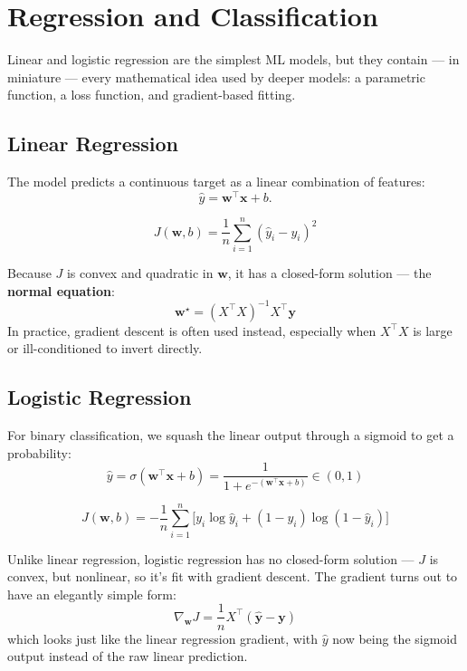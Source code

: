 \chapter{Regression and Classification}

Linear and logistic regression are the simplest ML models, but they
contain — in miniature — every mathematical idea used by deeper models:
a parametric function, a loss function, and gradient-based fitting.

\section{Linear Regression}

The model predicts a continuous target as a linear combination of features:
\[
  \hat y = \mathbf{w}^\top \mathbf{x} + b.
\]

\begin{definition}
\[
  J(\mathbf{w}, b) = \frac{1}{n}\sum_{i=1}^n \left(\hat y_i - y_i\right)^2
\]
\end{definition}

Because $J$ is convex and quadratic in $\mathbf{w}$, it has a closed-form
solution — the \textbf{normal equation}:
\[
  \mathbf{w}^\star = (X^\top X)^{-1} X^\top \mathbf{y}
\]
In practice, gradient descent is often used instead, especially when $X^\top X$
is large or ill-conditioned to invert directly.


\section{Logistic Regression}

For binary classification, we squash the linear output through a sigmoid
to get a probability:
\[
  \hat y = \sigma(\mathbf{w}^\top\mathbf{x} + b) = \frac{1}{1+e^{-(\mathbf{w}^\top\mathbf{x}+b)}} \in (0,1)
\]

\begin{definition}
\[
  J(\mathbf{w}, b) = -\frac{1}{n}\sum_{i=1}^n \Big[y_i \log \hat y_i + (1-y_i)\log(1-\hat y_i)\Big]
\]
\end{definition}

Unlike linear regression, logistic regression has no closed-form solution
— $J$ is convex, but nonlinear, so it's fit with gradient descent. The
gradient turns out to have an elegantly simple form:
\[
  \nabla_{\mathbf{w}} J = \frac{1}{n} X^\top (\hat{\mathbf{y}} - \mathbf{y})
\]
which looks just like the linear regression gradient, with $\hat y$ now
being the sigmoid output instead of the raw linear prediction.

